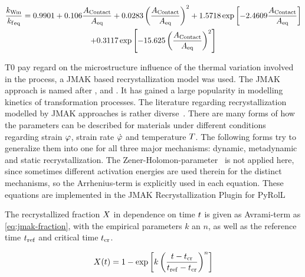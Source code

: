 \begin{multline}
    \frac{{k_\mathrm{Wm}}}{{{{k_\mathrm{f}}}_\mathrm{eq}}} = \num{0.9901} + \num{0.106} \frac{{{A}_\mathrm{Contact}}}{{{{A}}_\mathrm{eq}}} + \num{0.0283} \left( \frac{{{A}_\mathrm{Contact}}}{{{{A}}_\mathrm{eq}}} \right)^2 + \num{1.5718} \exp \left[ \num{-2.4609} \frac{{{A}_\mathrm{Contact}}}{{{{A}}_\mathrm{eq}}} \right] \\
    + \num{0.3117} \exp \left[ \num{-15.625} \left( \frac{{{A}_\mathrm{Contact}}}{{{{A}}_\mathrm{eq}}} \right)^2 \right]
    \label{eq:deformation-resistance}
\end{multline}

T0 pay regard on the microstructure influence of the thermal variation involved in the process, a JMAK based recrystallization model was used.
The JMAK approach is named after \textcite{Johnson1939}, \textcite{Avrami1939, Avrami1940, Avrami1941} and \textcite{Kolmogorov1937}.
It has gained a large popularity in modelling kinetics of transformation processes.
The literature regarding recrystallization modelled by JMAK approaches is rather diverse~\cite{Luton1969, Sellars1978, Sellars1979, Sellars1985, Beynon1992, Glover1972, Glover1973, Hodgson1992, Laasraoui1991, Laasraoui1991a, Hernandez1996, Medina1996, Fernandez2000, Fernandez2003, Karhausen1992,Roberts1979, Maccagno1996, Siciliano2000}.
There are many forms of how the parameters can be described for materials under different conditions regarding strain ${\varphi}$, strain rate ${\dot{\varphi}}$ and temperature ${T}$.
The following forms try to generalize them into one for all three major mechanisms: dynamic, metadynamic and static recrystallization.
The Zener-Holomon-parameter~\cite{Zener1944} is not applied here, since sometimes different activation energies are used therein for the distinct mechanisms, so the Arrhenius-term is explicitly used in each equation.
These equations are implemented in the JMAK Recrystallization Plugin for PyRolL~\cite{pyroll-jmak-recrystallization}

The recrystallized fraction ${X}$ in dependence on time ${t}$ is given as Avrami-term as \autoref{eq:jmak-fraction}, with the empirical parameters $k$ an $n$, as well as the reference time ${t}_{\mathrm{ref}}$ and critical time ${t}_{{\mathrm{cr}}}$.

\begin{equation}
    {X}({t}) = 1 - \exp \left[ k \left( \frac{{t} - {t}_{\mathrm{cr}}}{{t}_{\mathrm{ref}} - {t}_{\mathrm{cr}}} \right)^n \right]
    \label{eq:jmak-fraction}
\end{equation}


